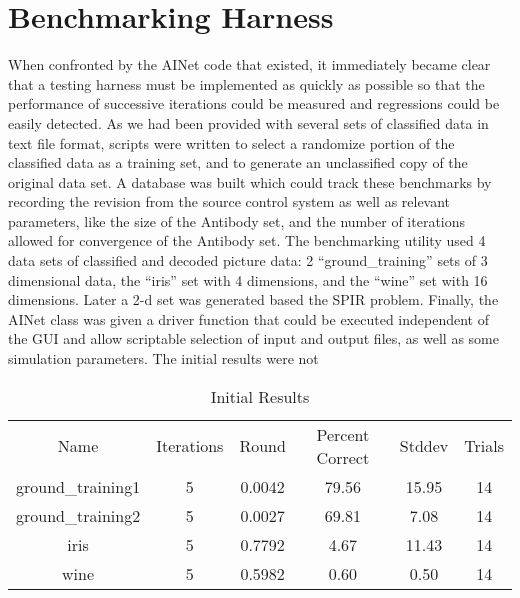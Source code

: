 \documentclass{article}
\theoremstyle{plain} %
\theoremstyle{remark}
\begin{document}
\section{Benchmarking Harness}
When confronted by the AINet code that existed, it immediately became
clear that a testing harness must be implemented as quickly as possible
so that the performance of successive iterations could be measured and
regressions could be easily detected. As we had been provided with
several sets of classified data in text file format, scripts were
written to select a randomize portion of the classified data as a
training set, and to generate an unclassified copy of the original data
set. A database was built which could track these benchmarks by
recording the revision from the source control system as well as
relevant parameters, like the size of the Antibody set, and the number
of iterations allowed for convergence of the Antibody set. The
benchmarking utility used 4 data sets of classified and decoded picture
data: 2 ``ground\_training'' sets of 3 dimensional data, the ``iris'' set with 4
dimensions, and the ``wine'' set with 16 dimensions. Later a 2-d set was
generated based the SPIR problem\cite{decastro}. Finally, the AINet
class was given a driver function that could be executed independent of
the GUI and allow scriptable selection of input and output files, as
well as some simulation parameters. The initial results were not

\begin{table}
\begin{tabular}{cccccc}
       Name       & Iterations & Round & Percent Correct &
Stddev & Trials \\
 ground\_training1 & 5 &  0.0042 & 79.56 & 15.95 &     14\\
 ground\_training2 & 5 &  0.0027 & 69.81 & 7.08  &     14\\
 iris             & 5 &  0.7792 &  4.67 & 11.43 &     14\\
 wine             & 5 &  0.5982 &  0.60 & 0.50  &     14\\
\end{tabular}
\caption{Initial Results}
\label{initial_res}
\end{table}
\end{document}

